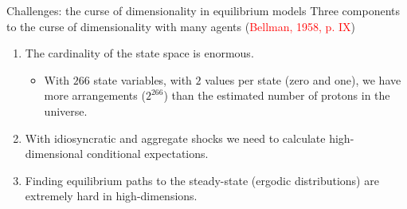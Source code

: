 \documentclass[aspectratio=169,10pt]{beamer}
\begin{document}
\begin{frame}{Challenges: the curse of dimensionality in equilibrium models}
	 Three components to the curse of dimensionality with many agents (\textcolor{red}{Bellman, 1958, p. IX})\vspace{0.1in}

		      \begin{enumerate}
			      \item The cardinality of the state space is enormous.\medskip
			       \begin{itemize}

			        \item With $266$ state variables, with $2$ values per state (zero and one), we have more arrangements ($2^{266}$) than the estimated number of protons in the universe.\vspace{0.1in} 
		        \end{itemize}

			      \item With idiosyncratic and aggregate shocks we need to calculate high-dimensional conditional expectations.\vspace{0.1in}
			      
			      \item Finding equilibrium paths to the steady-state (ergodic distributions) are extremely hard in high-dimensions.
		      \end{enumerate}
\end{frame}
\end{document}
